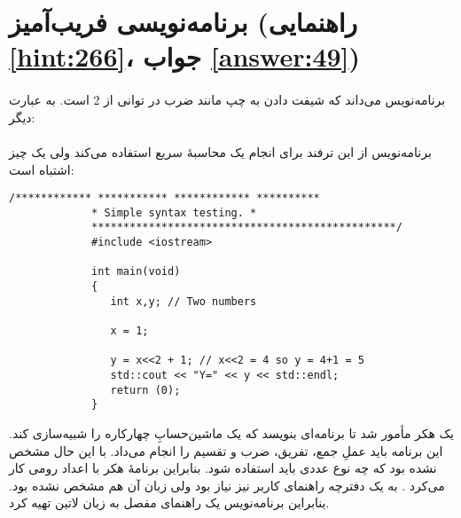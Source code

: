 \section[برنامه‌نویسی فریب‌آمیز]{برنامه‌نویسی فریب‌آمیز \protect{} (راهنمایی \ref{hint:266}، جواب \ref{answer:49})}
\paragraph{}\label{prog:14}
برنامه‌نویس می‌داند که شیفت دادن به چپ مانند ضرب در توانی از 2 است. به عبارت دیگر:
\LTR
\noindent{}   \\
   \\
   
\RTL
برنامه‌نویس از این ترفند برای انجام یک محاسبهٔ سریع استفاده می‌کند ولی یک چیز اشتباه است:

\begin{LTR}
        \begin{lstlisting}[style=C++Style]
             /************ *********** ************ **********
             * Simple syntax testing. *
             ************************************************/
             #include <iostream>

             int main(void)
             {
             	int x,y; // Two numbers

             	x = 1;

             	y = x<<2 + 1; // x<<2 = 4 so y = 4+1 = 5
             	std::cout << "Y=" << y << std::endl;
             	return (0);
             }
        \end{lstlisting}
\end{LTR}

\begin{tcolorbox}
    یک هکر مأمور شد تا برنامه‌ای بنویسد که یک ماشین‌حسابِ چهارکاره را شبیه‌سازی کند. این برنامه باید عملِ جمع، تفریق، ضرب و تقسیم را انجام می‌داد. با این حال مشخص نشده بود که چه نوع عددی باید استفاده شود. بنابراین برنامهٔ هکر با اعداد رومی کار می‌کرد . به یک دفترچه راهنمای کاربر نیز نیاز بود ولی زبان آن هم مشخص نشده بود. بنابراین برنامه‌نویس یک راهنمای مفصل به زبان لاتین تهیه کرد.
\end{tcolorbox}